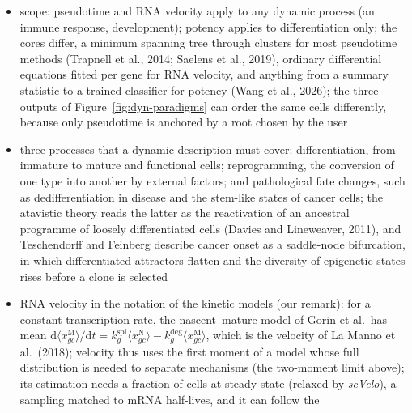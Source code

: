 \begin{itemize}
  \item scope: pseudotime and RNA velocity apply to any dynamic process (an immune response, development); potency
        applies to differentiation only; the cores differ, a minimum spanning tree through clusters for most pseudotime
        methods (Trapnell et al., 2014; Saelens et al., 2019), ordinary differential equations fitted per gene for RNA velocity, and anything from a summary statistic
        to a trained classifier for potency (Wang et al., 2026); the three outputs of Figure~\ref{fig:dyn-paradigms}
        can order the same cells differently, because only pseudotime is anchored by a root chosen by the user
  \item three processes that a dynamic description must cover: differentiation, from immature to mature and functional
        cells; reprogramming, the conversion of one type into another by external factors; and pathological fate
        changes, such as dedifferentiation in disease and the stem-like states of cancer cells; the atavistic theory
        reads the latter as the reactivation of an ancestral programme of loosely differentiated cells (Davies and
        Lineweaver, 2011), and Teschendorff and Feinberg describe cancer onset as a saddle-node bifurcation, in which
        differentiated attractors flatten and the diversity of epigenetic states rises before a clone is selected
  \item RNA velocity in the notation of the kinetic models (our remark): for a constant transcription rate, the
        nascent--mature model of Gorin et al.\ has mean
        \(\mathrm{d}\langle x^{\mathrm{M}}_{gc}\rangle/\mathrm{d}t=k^{\mathrm{spl}}_{g}\langle x^{\mathrm{N}}_{gc}\rangle-k^{\mathrm{deg}}_{g}\langle x^{\mathrm{M}}_{gc}\rangle\),
        which is the velocity of La Manno et al.\ (2018); velocity thus uses the first moment of a model whose full
        distribution is needed to separate mechanisms (the two-moment limit above); its estimation needs a fraction of
        cells at steady state (relaxed by \emph{scVelo}), a sampling matched to mRNA half-lives, and it can follow the

\end{itemize}
